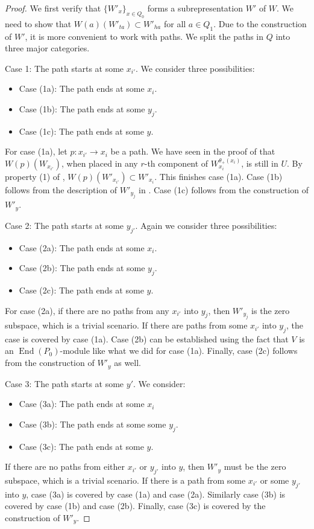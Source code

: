 \documentclass[a4paper]{amsart}
\numberwithin{equation}{section}
\theoremstyle{plain}
\theoremstyle{definition}
\DeclareMathOperator{\Endo}{End}
\begin{document}
\begin{proof}
We first verify that $\{W'_{x}\}_{x\in Q_0}$ forms a subrepresentation $W'$ of $W$. We need to show that $W(a)(W'_{ta})\subset W'_{ha}$ for all $a\in Q_1$. Due to the construction of $W'$, it is more convenient to work with paths.  We split the paths in $Q$ into three major categories.

Case 1: The path starts at some $x_{i'}$. We consider three possibilities:
\begin{itemize}
\item Case (1a): The path ends at some $x_i$.
\item Case (1b): The path ends at some $y_{j}$.
\item Case (1c): The path ends at some $y$.
\end{itemize}
For case (1a), let $p:x_{i'}\rightarrow x_i$ be a path. We have seen in the proof of  that $W(p)(W_{x_{i'}})$, when placed in any $r$-th component of $W_{x_i}^{\theta_{+}(x_i)}$, is still in $U$. By property (1) of , $W(p)(W'_{x_{i'}})\subset W'_{x_i}$. This finishes case (1a). Case (1b) follows from the description of $W'_{y_j}$ in . Case (1c) follows from the construction of $W'_{y}$.

Case 2: The path starts at some $y_{j'}$. Again we consider three possibilities:
\begin{itemize}
\item Case (2a): The path ends at some $x_{i}$.
\item Case (2b): The path ends at some $y_{j}$.
\item Case (2c): The path ends at some $y$.
\end{itemize}
For case (2a), if there are no paths from any $x_{i'}$ into $y_{j}$, then $W'_{y_{j}}$ is the zero subspace, which is a trivial scenario. If there are paths from some $x_{i'}$ into $y_{j}$, the case is covered by case (1a). Case (2b) can be established using the fact that $V$ is an $\Endo(P_0)$-module like what we did for case (1a). Finally, case (2c) follows from the construction of $W'_{y}$ as well.

Case 3: The path starts at some $y'$. We consider:
\begin{itemize}
\item Case (3a): The path ends at some $x_{i}$
\item Case (3b): The path ends at some some $y_{j}$.
\item Case (3c): The path ends at some $y$.
\end{itemize}
If there are no paths from either $x_{i'}$ or $y_{j'}$ into $y$, then $W'_{y}$ must be the zero subspace, which is a trivial scenario. If there is a path from some $x_{i'}$ or some $y_{j'}$ into $y$, case (3a) is covered by case (1a) and case (2a). Similarly case (3b) is covered by case (1b) and case (2b). Finally, case (3c) is covered by the construction of $W'_{y}$.


\end{proof}
\end{document}
